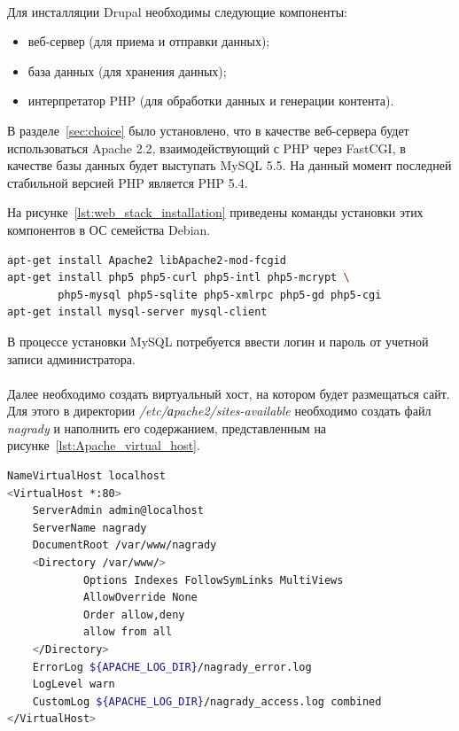 \paragraph{}
Для инсталляции Drupal необходимы следующие компоненты:

\begin{itemize}
\item
  веб-сервер (для приема и отправки данных);
\item
  база данных (для хранения данных);
\item
  интерпретатор PHP (для обработки данных и генерации контента).
\end{itemize}

В разделе~\ref{sec:choice} было установлено, что в качестве веб-сервера будет
использоваться Apache 2.2, взаимодействующий с PHP через FastCGI,
в качестве базы данных будет выступать MySQL 5.5.
На данный момент последней стабильной версией PHP является PHP 5.4. 

На рисунке~\ref{lst:web_stack_installation} приведены команды установки этих
компонентов в ОС семейства Debian.

\begin{lstlisting}[language=bash,
  caption=Команды установки веб-стека для работы Drupal,
  label=lst:web_stack_installation]
apt-get install Apache2 libApache2-mod-fcgid
apt-get install php5 php5-curl php5-intl php5-mcrypt \ 
        php5-mysql php5-sqlite php5-xmlrpc php5-gd php5-cgi
apt-get install mysql-server mysql-client
\end{lstlisting}

В процессе установки MySQL потребуется ввести логин и пароль от учетной записи
администратора.

\paragraph{}
Далее необходимо создать виртуальный хост, на котором будет размещаться сайт.
Для этого в директории \textit{/etc/аpache2/sites-available} необходимо создать
файл \textit{nagrady} и наполнить его содержанием, представленным на
рисунке~\ref{lst:Apache_virtual_host}.

\begin{lstlisting}[language=bash,xleftmargin=2em,
  caption=Содержимое конфигурационного файла Apache,
  label=lst:Apache_virtual_host]
NameVirtualHost localhost
<VirtualHost *:80>
    ServerAdmin admin@localhost
    ServerName nagrady
    DocumentRoot /var/www/nagrady
    <Directory /var/www/>
            Options Indexes FollowSymLinks MultiViews
            AllowOverride None
            Order allow,deny
            allow from all
    </Directory>
    ErrorLog ${APACHE_LOG_DIR}/nagrady_error.log
    LogLevel warn
    CustomLog ${APACHE_LOG_DIR}/nagrady_access.log combined
</VirtualHost>
\end{lstlisting}

